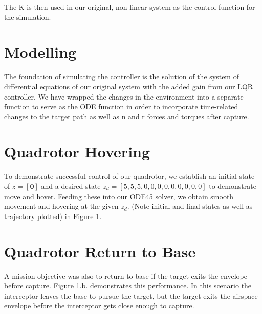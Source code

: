 \documentclass{article}
\begin{document}
\noindent The K is then used in our original, non linear system as the control function for the simulation.  
\bigskip
\section*{Modelling}

\noindent
The foundation of simulating the controller is the solution of the system of differential equations of our original system with the added gain from our LQR controller.  We have wrapped the changes in the environment into a separate function to serve as the ODE function in order to incorporate time-related changes to the target path as well as n and r forces and torques after capture.
\section*{Quadrotor Hovering}
To demonstrate successful control of our quadrotor, we establish an initial state of $z=[\mathbf{0}]$ and a desired state $z_d=[5,5,5,0,0,0,0,0,0,0,0,0] $ to demonstrate move and hover.  Feeding these into our ODE45 solver, we obtain smooth movement and hovering at the given $z_d$.  (Note initial and final states as well as trajectory plotted) in Figure 1.
\section*{Quadrotor Return to Base}
A mission objective was also to return to base if the target exits the envelope before capture.  Figure 1.b. demonstrates this performance. In this scenario the interceptor leaves the base to pursue the target, but the target exits the airspace envelope before the interceptor gets close enough to capture.
\end{document}
